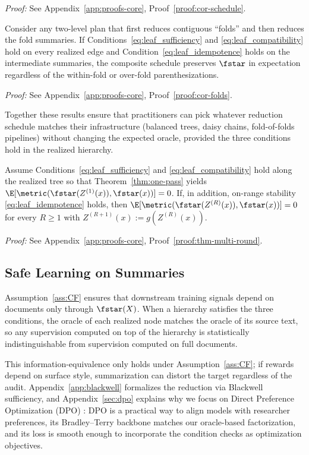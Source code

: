 \noindent\textit{Proof:} See Appendix~\ref{app:proofs-core}, Proof~\ref{proof:cor-schedule}.

\begin{corollary}\label{cor:folds}
Consider any two-level plan that first reduces contiguous ``folds'' and then reduces the fold summaries. If Conditions~\eqref{eq:leaf_sufficiency} and \eqref{eq:leaf_compatibility} hold on every realized edge and Condition~\eqref{eq:leaf_idempotence} holds on the intermediate summaries, the composite schedule preserves $\fstar$ in expectation regardless of the within-fold or over-fold parenthesizations.
\end{corollary}

\noindent\textit{Proof:} See Appendix~\ref{app:proofs-core}, Proof~\ref{proof:cor-folds}.

Together these results ensure that practitioners can pick whatever reduction schedule matches their infrastructure (balanced trees, daisy chains, fold-of-folds pipelines) without changing the expected oracle, provided the three conditions hold in the realized hierarchy.

\begin{theorem}\label{thm:multi-round}
Assume Conditions~\eqref{eq:leaf_sufficiency} and \eqref{eq:leaf_compatibility} hold along the realized tree so that Theorem~\ref{thm:one-pass} yields $\E[\metric(\fstar(Z^{(1)}(x)), \fstar(x))] = 0$. If, in addition, on-range stability \eqref{eq:leaf_idempotence} holds, then $\E[\metric(\fstar(Z^{(R)}(x)), \fstar(x))] = 0$ for every $R \geq 1$ with $Z^{(R+1)}(x) := g(Z^{(R)}(x))$.
\end{theorem}

\noindent\textit{Proof:} See Appendix~\ref{app:proofs-core}, Proof~\ref{proof:thm-multi-round}.

\subsection{Safe Learning on Summaries}\label{sec:exist-learn-transport}

Assumption~\ref{ass:CF} ensures that downstream training signals depend on documents only through $\fstar(X)$. When a hierarchy satisfies the three conditions, the oracle of each realized node matches the oracle of its source text, so any supervision computed on top of the hierarchy is statistically indistinguishable from supervision computed on full documents.

This information-equivalence only holds under Assumption~\ref{ass:CF}; if rewards depend on surface style, summarization can distort the target regardless of the audit. Appendix~\ref{app:blackwell} formalizes the reduction via Blackwell sufficiency, and Appendix~\ref{sec:dpo} explains why we focus on Direct Preference Optimization (DPO) \citep{RafailovEtAl2023DPO}: DPO is a practical way to align models with researcher preferences, its Bradley--Terry backbone matches our oracle-based factorization, and its loss is smooth enough to incorporate the condition checks as optimization objectives.

